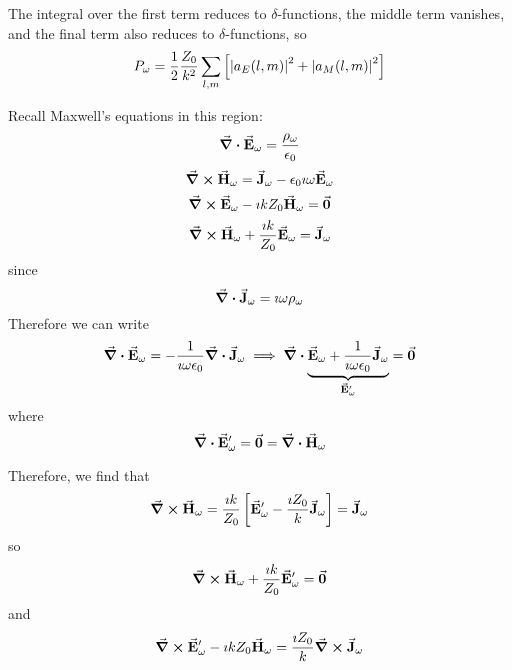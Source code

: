 \documentclass[a4paper,twoside,master.tex]{subfiles}
\begin{document}
The integral over the first term reduces to $\delta$-functions, the middle term vanishes, and the final term also reduces to $\delta$-functions, so
\begin{equation}
    P_{\omega} = \frac{1}{2} \frac{Z_0}{k^2} \sum_{l,m} \left[ \abs{a_E(l,m)}^2 + \abs{a_M(l,m)}^2 \right]
\end{equation}

Recall Maxwell's equations in this region:
\begin{equation}
    \div{ \va{E}_{\omega}} = \frac{\rho_{\omega}}{\epsilon_0}
\end{equation}
\begin{equation}
    \curl{ \va{H}_{\omega}} = \va{J}_{\omega} - \epsilon_0 \imath \omega \va{E}_{\omega}
\end{equation}
\begin{equation}
    \curl{ \va{E}_{\omega}} - \imath k Z_0 \va{H}_{\omega} = \va{0}
\end{equation}
\begin{equation}
    \curl{ \va{H}_{\omega}} + \frac{\imath k}{Z_0} \va{E}_{\omega} = \va{J}_{\omega}
\end{equation}
since
\begin{equation}
    \div{ \va{J}_{\omega}} = \imath \omega \rho_{\omega}
\end{equation}
Therefore we can write
\begin{equation}
    \div{ \va{E}_{\omega}} = - \frac{1}{\imath \omega \epsilon_0} \div{ \va{J}_{\omega}} \implies \div{\underbrace{ \va{E}_{\omega} + \frac{1}{\imath \omega \epsilon_0} \va{J}_{\omega}}_{ \va{E}_{\omega}'}} = \va{0}
\end{equation}
where
\begin{equation}
    \div{ \va{E}_{\omega}'} = \va{0} = \div{ \va{H}_{\omega}}
\end{equation}

Therefore, we find that
\begin{equation}
    \curl{ \va{H}_{\omega}} = \frac{\imath k}{Z_0} \left[ \va{E}_{\omega}' - \frac{\imath Z_0}{k} \va{J}_{\omega} \right] = \va{J}_{\omega}
\end{equation}
so
\begin{equation}
    \curl{ \va{H}_{\omega}} + \frac{\imath k}{Z_0} \va{E}_{\omega}' = \va{0}
\end{equation}
and
\begin{equation}
    \curl{ \va{E}_{\omega}'} - \imath k Z_0 \va{H}_{\omega} = \frac{\imath Z_0}{k} \curl{ \va{J}_{\omega}}
\end{equation}
\end{document}
